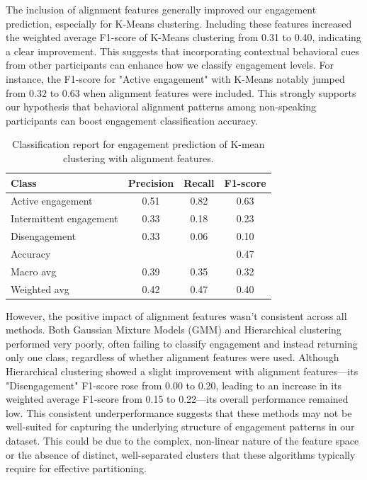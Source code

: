 \documentclass[
]{ceurart}
\begin{document}
The inclusion of alignment features generally improved our engagement prediction, especially for K-Means clustering. Including these features increased the weighted average F1-score of K-Means clustering from 0.31 to 0.40, indicating a clear improvement. This suggests that incorporating contextual behavioral cues from other participants can enhance how we classify engagement levels. For instance, the F1-score for "Active engagement" with K-Means notably jumped from 0.32 to 0.63 when alignment features were included. This strongly supports our hypothesis that behavioral alignment patterns among non-speaking participants can boost engagement classification accuracy.

\begin{table}[ht]
  \caption{Classification report for engagement prediction of K-mean clustering with alignment features.}
  \label{tab:classification_report}
  \centering
  \begin{tabular}{lccc}
    \toprule
    Class & Precision & Recall & F1-score \\
    \midrule
    Active engagement        & 0.51 & 0.82 & 0.63 \\
    Intermittent engagement  & 0.33 & 0.18 & 0.23 \\
    Disengagement            & 0.33 & 0.06 & 0.10 \\
    \midrule
    Accuracy                 &      &      & 0.47 \\
    Macro avg                & 0.39 & 0.35 & 0.32 \\
    Weighted avg             & 0.42 & 0.47 & 0.40 \\
    \bottomrule
  \end{tabular}
\end{table}


However, the positive impact of alignment features wasn't consistent across all methods. Both Gaussian Mixture Models (GMM) and Hierarchical clustering performed very poorly, often failing to classify engagement and instead returning only one class, regardless of whether alignment features were used. Although Hierarchical clustering showed a slight improvement with alignment features—its "Disengagement" F1-score rose from 0.00 to 0.20, leading to an increase in its weighted average F1-score from 0.15 to 0.22—its overall performance remained low. This consistent underperformance suggests that these methods may not be well-suited for capturing the underlying structure of engagement patterns in our dataset. This could be due to the complex, non-linear nature of the feature space or the absence of distinct, well-separated clusters that these algorithms typically require for effective partitioning.
\end{document}
